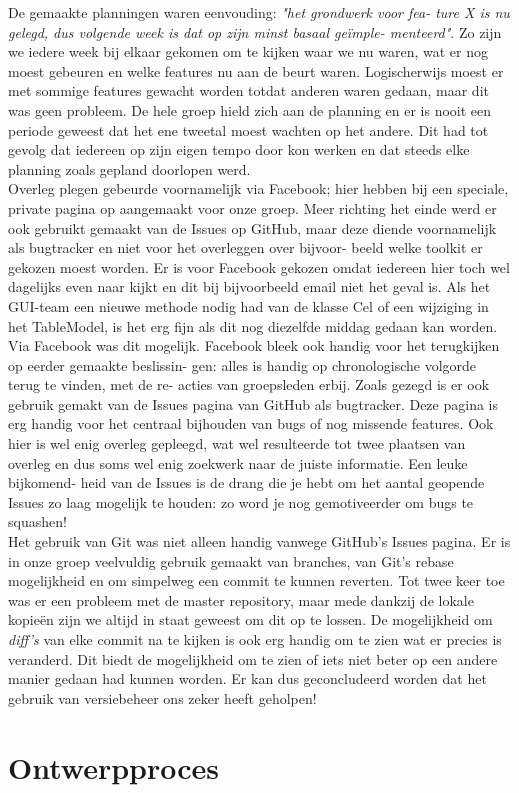\documentclass[a4paper,11pt]{article}
\begin{document}
De gemaakte planningen waren eenvouding: \textit{"het grondwerk voor fea-
ture X is nu gelegd, dus volgende week is dat op zijn minst basaal geïmple-
menteerd"}. Zo zijn we iedere week bij elkaar gekomen om te kijken waar
we nu waren, wat er nog moest gebeuren en welke features nu aan de beurt
waren. Logischerwijs moest er met sommige features gewacht worden totdat
anderen waren gedaan, maar dit was geen probleem. De hele groep hield
zich aan de planning en er is nooit een periode geweest dat het ene tweetal
moest wachten op het andere. Dit had tot gevolg dat iedereen op zijn eigen
tempo door kon werken en dat steeds elke planning zoals gepland doorlopen
werd.\\

Overleg plegen gebeurde voornamelijk via Facebook; hier hebben bij een
speciale, private pagina op aangemaakt voor onze groep. Meer richting het
einde werd er ook gebruikt gemaakt van de Issues op GitHub, maar deze
diende voornamelijk als bugtracker en niet voor het overleggen over bijvoor-
beeld welke toolkit er gekozen moest worden. Er is voor Facebook gekozen
omdat iedereen hier toch wel dagelijks even naar kijkt en dit bij bijvoorbeeld
email niet het geval is. Als het GUI-team een nieuwe methode nodig had
van de klasse Cel of een wijziging in het TableModel, is het erg fijn als dit
nog diezelfde middag gedaan kan worden. Via Facebook was dit mogelijk.
Facebook bleek ook handig voor het terugkijken op eerder gemaakte beslissin-
gen: alles is handig op chronologische volgorde terug te vinden, met de re-
acties van groepsleden erbij. Zoals gezegd is er ook gebruik gemakt van de
Issues pagina van GitHub als bugtracker. Deze pagina is erg handig voor
het centraal bijhouden van bugs of nog missende features. Ook hier is wel
enig overleg gepleegd, wat wel resulteerde tot twee plaatsen van overleg en
dus soms wel enig zoekwerk naar de juiste informatie. Een leuke bijkomend-
heid van de Issues is de drang die je hebt om het aantal geopende Issues zo
laag mogelijk te houden: zo word je nog gemotiveerder om bugs te squashen!\\

Het gebruik van Git was niet alleen handig vanwege GitHub’s Issues
pagina. Er is in onze groep veelvuldig gebruik gemaakt van branches, van
Git’s rebase mogelijkheid en om simpelweg een commit te kunnen reverten.
Tot twee keer toe was er een probleem met de master repository, maar mede
dankzij de lokale kopieën zijn we altijd in staat geweest om dit op te lossen.
De mogelijkheid om \textit{diff’s} van elke commit na te kijken is ook erg handig
om te zien wat er precies is veranderd. Dit biedt de mogelijkheid om te zien
of iets niet beter op een andere manier gedaan had kunnen worden. Er kan
dus geconcludeerd worden dat het gebruik van versiebeheer ons zeker heeft
geholpen!\\

\newpage\section{Ontwerpproces}
\end{document}
